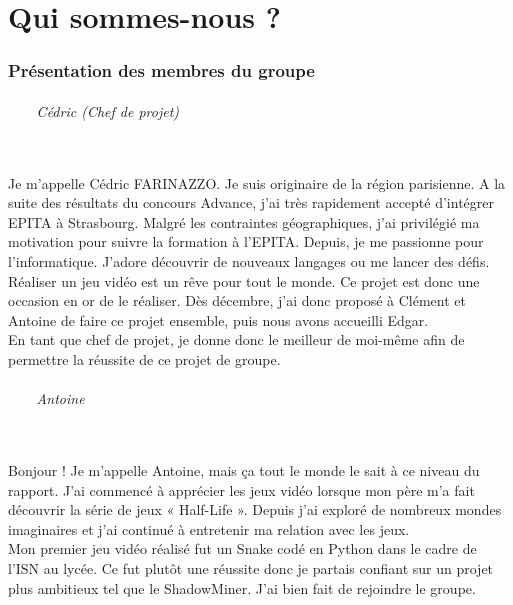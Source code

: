 \documentclass[titlepage, 13px, a4paper]{report}
\begin{document}


\newpage


\part{Qui sommes-nous ?}
\section{Présentation des membres du groupe}

\paragraph{~~~~Cédric (Chef de projet)} \hspace{0pt} \\
Je m’appelle Cédric FARINAZZO. Je suis originaire de la région parisienne. 
A la suite des résultats du concours Advance, j'ai très rapidement accepté d'intégrer EPITA à Strasbourg. 
Malgré les contraintes géographiques, j'ai privilégié ma motivation pour suivre la formation à l'EPITA. 
Depuis, je me passionne pour l’informatique. J’adore découvrir de nouveaux langages ou me lancer des défis. \\
Réaliser un jeu vidéo est un rêve pour tout le monde. Ce projet est donc une occasion en or de le réaliser. 
Dès décembre, j’ai donc proposé à Clément et Antoine de faire ce projet ensemble, puis nous avons accueilli Edgar. \\
En tant que chef de projet, je donne donc le meilleur de moi-même afin de permettre la réussite de ce projet de groupe. \\


\paragraph{~~~~Antoine} \hspace{0pt} \\
Bonjour ! Je m'appelle Antoine, mais ça tout le monde le sait à ce niveau du rapport.  
J'ai commencé à apprécier les jeux vidéo lorsque mon père m'a fait découvrir la série de 
jeux « Half-Life ». Depuis j'ai exploré de nombreux mondes imaginaires et j'ai continué à 
entretenir ma relation avec les jeux. \\
Mon premier jeu vidéo réalisé fut un Snake codé 
en Python dans le cadre de l'ISN au lycée. Ce fut plutôt une réussite donc je partais 
confiant sur un projet plus ambitieux tel que le ShadowMiner. J'ai bien fait de rejoindre le groupe. \\
\end{document}
